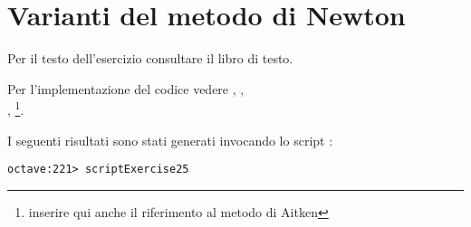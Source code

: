 \section{Varianti del metodo di Newton}
\label{sec:variantsMetodoDiNewton}

\begin{exercise}[2.5]
Per il testo dell'esercizio consultare il libro di testo.
\end{exercise}

Per l'implementazione del codice vedere ,
,
\\, \footnote{inserire
qui anche il riferimento al metodo di Aitken}.

I seguenti risultati sono stati generati invocando lo script
:
\begin{lstlisting}
octave:221> scriptExercise25
\end{lstlisting}


